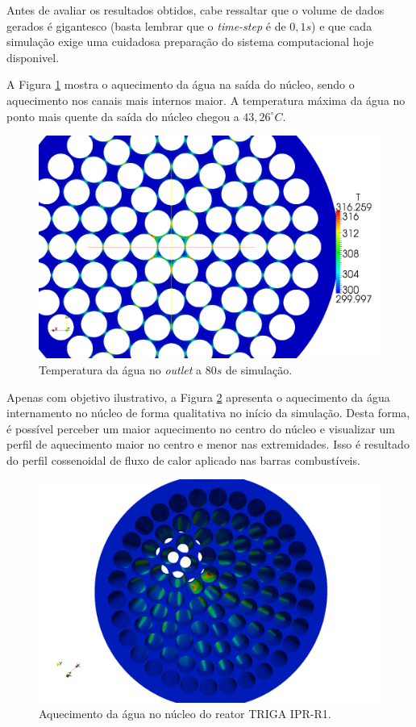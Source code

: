 \documentclass[12pt,openright,twoside,a4paper,english,french,spanish,brazil]{abntex2}
\begin{document}
Antes de avaliar os resultados obtidos, cabe ressaltar que o volume de dados gerados é gigantesco (basta lembrar que o 
\textit{time-step} é de $0,1 s$) e que cada simulação exige uma cuidadosa preparação do sistema computacional hoje disponivel.

A Figura \ref{fig:topo} mostra o aquecimento da água na saída do núcleo, sendo o aquecimento nos canais mais internos 
maior. A temperatura máxima da água no ponto mais quente da saída do núcleo chegou a $43,26^{\circ}C$. 

\begin{figure}[h]
  \centering\includegraphics[scale=0.25]{figuras/v8_5.png}
  \caption{Temperatura da água no \textit{outlet} a $80 s$ de simulação.}
  \label{fig:topo}
\end{figure}

Apenas com objetivo ilustrativo, a Figura \ref{fig:nucleo} apresenta o aquecimento da água 
internamento no núcleo de forma qualitativa no início da simulação. Desta forma, é possível 
perceber um maior aquecimento no centro do núcleo e visualizar um perfil de aquecimento 
maior no centro e menor nas extremidades. Isso é resultado do perfil cossenoidal de fluxo 
de calor aplicado nas barras combustíveis.


\begin{figure}[h]
  \centering\includegraphics[scale=0.3]{figuras/v8_3_alt.png}
  \caption{Aquecimento da água no núcleo do reator TRIGA IPR-R1.}
  \label{fig:nucleo}
\end{figure}
\end{document}
